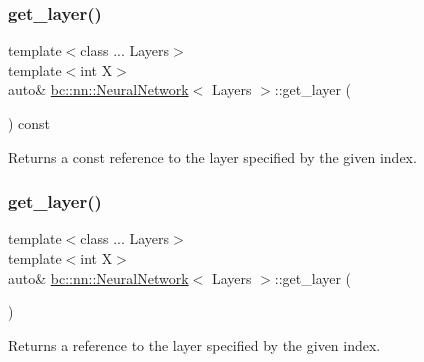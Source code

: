\subsubsection{\texorpdfstring{get\+\_\+layer()}{get\_layer()}\hspace{0.1cm}{\footnotesize\ttfamily [1/2]}}
{\footnotesize\ttfamily template$<$class ... Layers$>$ \\
template$<$int X$>$ \\
auto\& \hyperlink{structbc_1_1nn_1_1NeuralNetwork}{bc\+::nn\+::\+Neural\+Network}$<$ Layers $>$\+::get\+\_\+layer (\begin{DoxyParamCaption}{ }\end{DoxyParamCaption}) const\hspace{0.3cm}{\ttfamily [inline]}}



Returns a const reference to the layer specified by the given index. 

\mbox{\label{structbc_1_1nn_1_1NeuralNetwork_a99f24e40c4a36e62896e27ee84040af2}} 
\subsubsection{\texorpdfstring{get\+\_\+layer()}{get\_layer()}\hspace{0.1cm}{\footnotesize\ttfamily [2/2]}}
{\footnotesize\ttfamily template$<$class ... Layers$>$ \\
template$<$int X$>$ \\
auto\& \hyperlink{structbc_1_1nn_1_1NeuralNetwork}{bc\+::nn\+::\+Neural\+Network}$<$ Layers $>$\+::get\+\_\+layer (\begin{DoxyParamCaption}{ }\end{DoxyParamCaption})\hspace{0.3cm}{\ttfamily [inline]}}



Returns a reference to the layer specified by the given index. 

\mbox{\label{structbc_1_1nn_1_1NeuralNetwork_a05de79606c5922a8bf12aa4b2f5a00b9}} 
